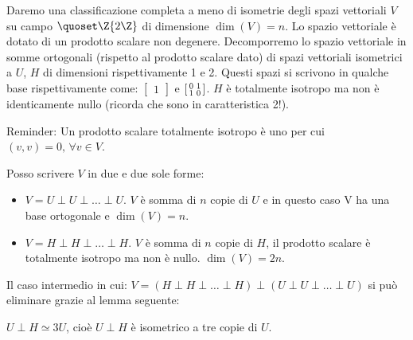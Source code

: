 

Daremo una classificazione completa a meno di isometrie degli spazi vettoriali $V$ su campo $\quoset\Z{2\Z}$ di dimensione 
$\dim(V) = n$. Lo spazio vettoriale è dotato di un prodotto scalare non degenere.
Decomporremo lo spazio vettoriale in somme ortogonali (rispetto al prodotto scalare dato) di spazi vettoriali isometrici
a $U$, $H$ di dimensioni rispettivamente 1 e 2. Questi spazi si scrivono in qualche base rispettivamente come: $\begin{bmatrix} 1 \end{bmatrix}$ e $\begin{bsmallmatrix} 0 & 1 \\ 1 & 0 \end{bsmallmatrix}$.
$H$ è totalmente isotropo ma non è identicamente nullo (ricorda che sono in caratteristica 2!).

Reminder: Un prodotto scalare totalmente isotropo è uno per cui $(v,v) = 0,\, \forall v \in V$.

\begin{teo}
 Posso scrivere $V$ in due e due sole forme:
 \begin{itemize}
  \item $V = U \perp U \perp \dots \perp U$.
  $V$ è somma di $n$ copie di $U$ e in questo caso V ha una base ortogonale e $\dim(V) = n$.
  \item $V = H \perp H \perp \dots \perp H$.
  $V$ è somma di $n$ copie di $H$, il prodotto scalare è totalmente isotropo ma non è nullo. $\dim(V) = 2n$.
 \end{itemize}
\end{teo}

Il caso intermedio in cui:  $V = (H \perp H \perp \dots \perp H) \perp (U \perp U \perp \dots \perp U)$ si può eliminare grazie al lemma seguente:

\begin{lemma}
 $U \perp H \simeq 3U$, cioè $U \perp H$ è isometrico a tre copie di $U$.
\end{lemma}


